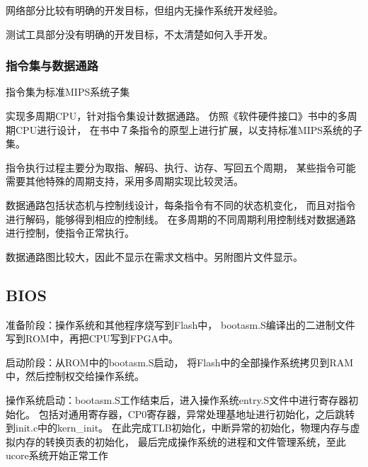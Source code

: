             网络部分比较有明确的开发目标，但组内无操作系统开发经验。

            测试工具部分没有明确的开发目标，不太清楚如何入手开发。

        \subsubsection{指令集与数据通路}
            指令集为标准MIPS系统子集

            实现多周期CPU，针对指令集设计数据通路。
            仿照《软件硬件接口》书中的多周期CPU进行设计，
            在书中７条指令的原型上进行扩展，以支持标准MIPS系统的子集。
            
            指令执行过程主要分为取指、解码、执行、访存、写回五个周期，
            某些指令可能需要其他特殊的周期支持，采用多周期实现比较灵活。

            数据通路包括状态机与控制线设计，每条指令有不同的状态机变化，
            而且对指令进行解码，能够得到相应的控制线。%
            在多周期的不同周期利用控制线对数据通路进行控制，使指令正常执行。
            
            数据通路图比较大，因此不显示在需求文档中。另附图片文件显示。

            
    \subsection{BIOS}
        准备阶段：操作系统和其他程序烧写到Flash中，%
        bootasm.S编译出的二进制文件写到ROM中，再把CPU写到FPGA中。

        启动阶段：从ROM中的bootasm.S启动，%
        将Flash中的全部操作系统拷贝到RAM中，然后控制权交给操作系统。

        操作系统启动：bootasm.S工作结束后，进入操作系统entry.S文件中进行寄存器初始化。
        包括对通用寄存器，CP0寄存器，异常处理基地址进行初始化，之后跳转到init.c中的kern\_init。
        在此完成TLB初始化，中断异常的初始化，物理内存与虚拟内存的转换页表的初始化，
        最后完成操作系统的进程和文件管理系统，至此ucore系统开始正常工作



